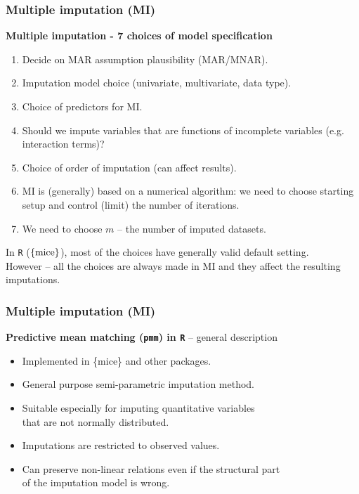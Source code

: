 \documentclass{beamer}
\begin{document}
\begin{frame}
\frametitle{Multiple imputation (MI)}
\textbf{Multiple imputation - 7 choices of model specification}\\
\smallskip
\begin{enumerate}
    \item Decide on MAR assumption plausibility (MAR/MNAR).
    \item Imputation model choice (univariate, multivariate, data type).
    \item Choice of predictors for MI.
    \item Should we impute variables that are functions of incomplete variables (e.g. interaction terms)?
    \item Choice of order of imputation (can affect results).
    \item MI is (generally) based on a numerical algorithm: we need to choose starting setup and control (limit) the number of iterations.
    \item We need to choose $m$ -- the number of imputed datasets.
\end{enumerate}
\smallskip
In \texttt{R} ($\{ \textnormal{mice} \}$), most of the choices have generally valid default setting.\\
\smallskip
However -- all the choices are always made in MI and they affect the resulting imputations.
\end{frame}
\begin{frame}
\frametitle{Multiple imputation (MI)}
\textbf{Predictive mean matching (\texttt{pmm}) in \texttt{R}} -- general description\\
\bigskip
\begin{itemize}
    \item Implemented in \{mice\} and other packages.
    \smallskip
    \item General purpose semi-parametric imputation method.
    \smallskip
    \item Suitable especially for imputing quantitative variables \\that are not normally distributed.
    \smallskip
    \item Imputations are restricted to observed values.
    \smallskip
    \item Can preserve non-linear relations even if the structural part \\of the imputation model is wrong.
\end{itemize}
\end{frame}
\end{document}
